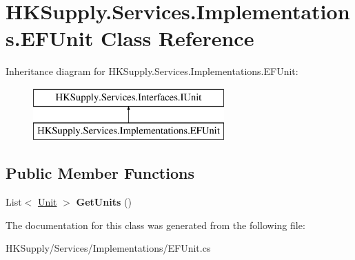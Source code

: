 \hypertarget{class_h_k_supply_1_1_services_1_1_implementations_1_1_e_f_unit}{}\section{H\+K\+Supply.\+Services.\+Implementations.\+E\+F\+Unit Class Reference}
\label{class_h_k_supply_1_1_services_1_1_implementations_1_1_e_f_unit}
Inheritance diagram for H\+K\+Supply.\+Services.\+Implementations.\+E\+F\+Unit\+:\begin{figure}[H]
\begin{center}
\leavevmode
\includegraphics[height=2.000000cm]{class_h_k_supply_1_1_services_1_1_implementations_1_1_e_f_unit}
\end{center}
\end{figure}
\subsection*{Public Member Functions}
\begin{DoxyCompactItemize}
\item 
\mbox{\label{class_h_k_supply_1_1_services_1_1_implementations_1_1_e_f_unit_a8cb0fb5e8778bd188c00c793d45efab1}} 
List$<$ \mbox{\hyperlink{class_h_k_supply_1_1_models_1_1_unit}{Unit}} $>$ {\bfseries Get\+Units} ()
\end{DoxyCompactItemize}


The documentation for this class was generated from the following file\+:\begin{DoxyCompactItemize}
\item 
H\+K\+Supply/\+Services/\+Implementations/E\+F\+Unit.\+cs\end{DoxyCompactItemize}
